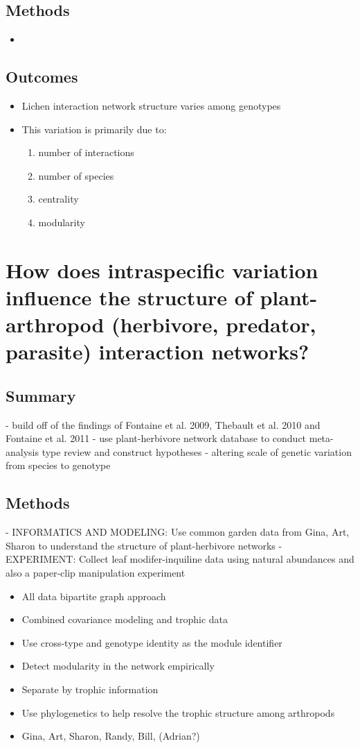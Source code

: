 \documentclass[12pt]{article}
\begin{document}
\subsection{Methods}
\begin{itemize}
\item 
\end{itemize}

\subsection{Outcomes}
\begin{itemize}
\item Lichen interaction network structure varies among genotypes
\item This variation is primarily due to:
  \begin{enumerate}
  \item number of interactions
  \item number of species
  \item centrality
  \item modularity
  \end{enumerate}
\end{itemize}

\section{How does intraspecific variation influence the
  structure of plant-arthropod (herbivore, predator, parasite)
  interaction networks?}
\subsection{Summary}
- build off of the findings of Fontaine et al. 2009, Thebault et al. 2010 and Fontaine et
al. 2011
- use plant-herbivore network database to conduct meta-analysis type
review and construct hypotheses
- altering scale of genetic variation from species to genotype

\subsection{Methods}
- INFORMATICS AND MODELING: Use common garden data from Gina, Art,
Sharon to understand the structure of plant-herbivore networks
- EXPERIMENT: Collect leaf modifer-inquiline data using natural
abundances and also a paper-clip manipulation experiment

\begin{itemize}
\item All data bipartite graph approach
\item Combined covariance modeling and trophic data
\item Use cross-type and genotype identity as the module identifier
\item Detect modularity in the network empirically
\item Separate by trophic information
\item Use phylogenetics to help resolve the trophic structure
  among arthropods
\item Gina, Art, Sharon, Randy, Bill, (Adrian?)
\end{itemize}
\end{document}
